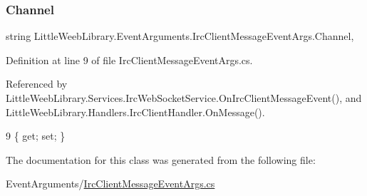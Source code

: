 \subsubsection{\texorpdfstring{Channel}{Channel}}
{\footnotesize\ttfamily string Little\+Weeb\+Library.\+Event\+Arguments.\+Irc\+Client\+Message\+Event\+Args.\+Channel\hspace{0.3cm}{\ttfamily [get]}, {\ttfamily [set]}}



Definition at line 9 of file Irc\+Client\+Message\+Event\+Args.\+cs.



Referenced by Little\+Weeb\+Library.\+Services.\+Irc\+Web\+Socket\+Service.\+On\+Irc\+Client\+Message\+Event(), and Little\+Weeb\+Library.\+Handlers.\+Irc\+Client\+Handler.\+On\+Message().


\begin{DoxyCode}
9 \{ \textcolor{keyword}{get}; \textcolor{keyword}{set}; \}
\end{DoxyCode}


The documentation for this class was generated from the following file\+:\begin{DoxyCompactItemize}
\item 
Event\+Arguments/\mbox{\hyperlink{_irc_client_message_event_args_8cs}{Irc\+Client\+Message\+Event\+Args.\+cs}}\end{DoxyCompactItemize}
